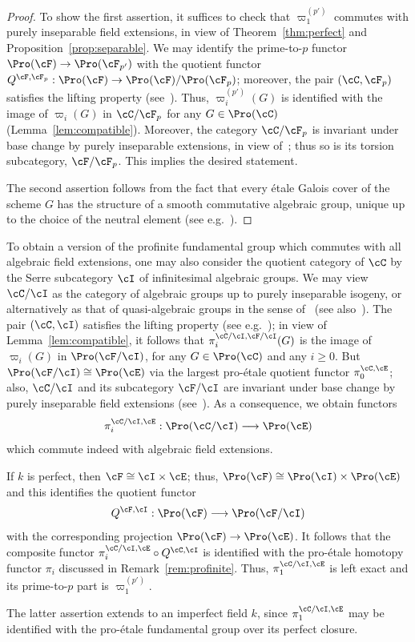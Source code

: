 \begin{proof}
To show the first assertion, it suffices to check that $\varpi_1^{(p')}$ commutes with purely inseparable field extensions, in view of Theorem~\ref{thm:perfect} and Proposition~\ref{prop:separable}. We may identify the prime-to-$p$ functor $\Pro(\cF) \to \Pro(\cF_{p'})$ with the quotient functor $Q^{\cF,\cF_p}: \Pro(\cF) \to \Pro(\cF)/\Pro(\cF_p)$; moreover, the pair $(\cC,\cF_p)$ satisfies the lifting property (see~\cite[Lem.~3.1]{Br17b}). Thus, $\varpi_i^{(p')}(G)$ is identified with the image of $\varpi_i(G)$ in $\cC/\cF_p$ for any $G \in \Pro(\cC)$ (Lemma~\ref{lem:compatible}). Moreover, the category $\cC/\cF_p$ is invariant under base change by purely inseparable extensions, in view of~\cite[Thm.~3.17]{Br17b}; thus so is its torsion subcategory, $\cF/\cF_p$. This implies the desired statement.

The second assertion follows from the fact that every
\'etale Galois cover of the scheme $G$ has the structure of a smooth commutative algebraic group, unique up to the choice of the neutral element (see e.g.~\cite[Prop.~1.1]{BS}).
\end{proof}

\begin{rema}\label{rem:proetale}
To obtain a version of the profinite fundamental group which commutes with all algebraic field extensions, one may also consider the quotient category of $\cC$ by the Serre subcategory $\cI$ of infinitesimal algebraic groups. We may view $\cC/\cI$ as the category of algebraic groups up to purely inseparable isogeny, or alternatively as that of quasi-algebraic groups in the sense of~\cite{Se60} (see also~\cite[V.3.4.5]{DG}). The pair $(\cC,\cI)$ satisfies the lifting property (see e.g.~\cite[Lem.~2.2]{Br17a}); in view of Lemma~\ref{lem:compatible}, it follows that $\pi_i^{\cC/\cI,\cF/\cI}(G)$ is the image of $\varpi_i(G)$ in $\Pro(\cF/\cI)$, for any $G \in \Pro(\cC)$ and any $i \geq 0$. But $\Pro(\cF/\cI) \cong \Pro(\cE)$ via the largest pro-\'etale quotient functor $\pi_0^{\cC,\cE}$; also, $\cC/\cI$ and its subcategory $\cF/\cI$ are invariant under base change by purely inseparable field extensions (see~\cite[Thm.~3.17]{Br17b}). As a consequence, we obtain functors
\[
\pi_i^{\cC/\cI,\cE} : \Pro(\cC/\cI) \longrightarrow \Pro(\cE)
\]
which commute indeed with algebraic field extensions.

If $k$ is perfect, then $\cF \cong \cI \times \cE$; thus, $\Pro(\cF) \cong \Pro(\cI) \times \Pro(\cE)$ and this identifies the quotient functor
\[
Q^{\cF,\cI} : \Pro(\cF) \longrightarrow \Pro(\cF/\cI)
\]
with the corresponding projection $\Pro(\cF) \to \Pro(\cE)$. It follows that the composite functor $\pi_i^{\cC/\cI,\cE} \circ Q^{\cC,\cI}$ is identified with the pro-\'etale homotopy functor $\pi_i$ discussed in Remark~\ref{rem:profinite}. Thus, $\pi_1^{\cC/\cI,\cE}$ is left exact and its prime-to-$p$ part is $\varpi_1^{(p')}$.

The latter assertion extends to an imperfect field $k$, since $\pi_1^{\cC/\cI,\cE}$ may be identified with the pro-\'etale fundamental group over its perfect closure.
\end{rema}

